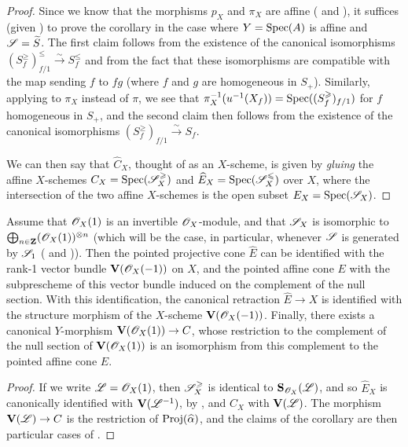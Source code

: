 \begin{proof}
Since we know that the morphisms $p_X$ and $\pi_X$ are affine ( and ), it suffices (given ) to prove the corollary in the case where $Y=\operatorname{Spec}(A)$ is affine and $\mathscr{S}=\widetilde{S}$.
The first claim follows from the existence of the canonical isomorphisms  $(S_f^\geq)_{f/1}^\leq \xrightarrow{\sim} S_f^\leq$ and from the fact that these isomorphisms are compatible with the map sending $f$ to $fg$ (where $f$ and $g$ are homogeneous in $S_+$).
Similarly, applying  to $\pi_X$ instead of $\pi$, we see that $\pi_X^{-1}(u^{-1}(X_f)) = \operatorname{Spec}((S_f^\geqslant)_{f/1})$ for $f$ homogeneous in $S_+$, and the second claim then follows from the existence of the canonical isomorphisms  $(S_f^\geq)_{f/1} \xrightarrow{\sim} S_f$.

We can then say that $\widehat{C}_X$, thought of as an $X$-scheme, is given by \emph{gluing} the affine $X$-schemes $C_X=\operatorname{Spec}(\mathscr{S}_X^\geqslant)$ and $\widehat{E}_X=\operatorname{Spec}(\mathscr{S}_X^\leqslant)$ over $X$, where the intersection of the two affine $X$-schemes is the open subset $E_X=\operatorname{Spec}(\mathscr{S}_X)$.
\end{proof}

\begin{corollary}[8.6.4]
\label{II.8.6.4}
Assume that $\mathscr{O}_X(1)$ is an invertible $\mathscr{O}_X$-module, and that $\mathscr{S}_X$ is isomorphic to $\bigoplus_{n\in\mathbf{Z}}(\mathscr{O}_X(1))^{\otimes n}$ (which will be the case, in particular, whenever $\mathscr{S}$ is generated by $\mathscr{S}_1$ ( and )).
Then the pointed projective cone $\widehat{E}$ can be identified with the rank-1 vector bundle $\mathbf{V}(\mathscr{O}_X(-1))$ on $X$, and the pointed affine cone $E$ with the subprescheme of this vector bundle induced on the complement of the null section.
With this identification, the canonical retraction $\widehat{E}\to X$ is identified with the structure morphism of the $X$-scheme $\mathbf{V}(\mathscr{O}_X(-1))$.
Finally, there exists a canonical $Y$-morphism $\bb{V}(\sh{O}_X(1))\to C$, whose restriction to the complement of the null section of $\mathbf{V}(\mathscr{O}_X(1))$ is an isomorphism from this complement to the pointed affine cone $E$.
\end{corollary}

\begin{proof}
If we write $\mathscr{L}=\mathscr{O}_X(1)$, then $\mathscr{S}_X^\geqslant$ is identical to $\mathbf{S}_{\mathscr{O}_X}(\mathscr{L})$, and so $\widehat{E}_X$ is canonically identified with $\mathbf{V}(\mathscr{L}^{-1})$, by , and $C_X$ with $\mathbf{V}(\mathscr{L})$.
The morphism $\bb{V}(\sh{L})\to C$ is the restriction of $\operatorname{Proj}(\widehat{\alpha})$, and the claims of the corollary are then particular cases of .
\end{proof}

